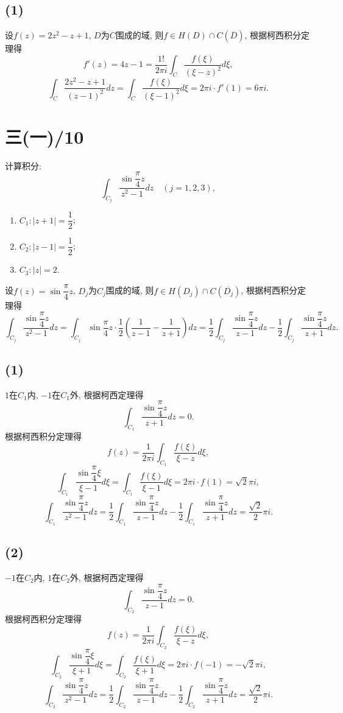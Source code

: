 \documentclass[11pt,a4paper]{article}
\begin{document}
\subsection*{(1)}
设$f(z)=2z^2-z+1$, $D$为$C$围成的域, 则$f\in H(D)\cap C(\overline{D})$, 根据柯西积分定理得
$$f'(z)=4z-1=\frac{1!}{2\pi i}\int_C\frac{f(\xi)}{(\xi-z)^2}d\xi,$$
$$\int_C\frac{2z^2-z+1}{(z-1)^2}dz=\int_C\frac{f(\xi)}{(\xi-1)^2}d\xi=2\pi i\cdot f'(1)=6\pi i.$$

\section{三(一)/10}
\begin{problem}
计算积分:
$$\int_{C_j}\frac{\sin\dfrac{\pi}{4}z}{z^2-1}dz\quad (j=1,2,3),$$
\begin{enumerate}
  \item $C_1:|z+1|=\dfrac{1}{2}$;
  \item $C_2:|z-1|=\dfrac{1}{2}$;
  \item $C_3:|z|=2$.
\end{enumerate}
\end{problem}

设$f(z)=\sin\dfrac{\pi}{4}z$, $D_j$为$C_j$围成的域, 则$f\in H(D_j)\cap C(\overline{D_j})$, 根据柯西积分定理得
$$\int_{C_j}\frac{\sin\dfrac{\pi}{4}z}{z^2-1}dz=\int_{C_j}\sin\dfrac{\pi}{4}z\cdot\frac{1}{2}\left(\frac{1}{z-1}-\frac{1}{z+1}\right)dz=\frac{1}{2}\int_{C_j}\frac{\sin\dfrac{\pi}{4}z}{z-1}dz-\frac{1}{2}\int_{C_j}\frac{\sin\dfrac{\pi}{4}z}{z+1}dz.$$

\subsection*{(1)}
$1$在$C_1$内, $-1$在$C_1$外, 根据柯西定理得
$$\int_{C_1}\frac{\sin\dfrac{\pi}{4}z}{z+1}dz=0.$$
根据柯西积分定理得
$$f(z)=\frac{1}{2\pi i}\int_{C_1}\frac{f(\xi)}{\xi-z}d\xi,$$
$$\int_{C_1}\frac{\sin\dfrac{\pi}{4}\xi}{\xi-1}d\xi=\int_{C_1}\frac{f(\xi)}{\xi-1}d\xi=2\pi i\cdot f(1)=\sqrt{2}\pi i,$$
$$\int_{C_1}\frac{\sin\dfrac{\pi}{4}z}{z^2-1}dz=\frac{1}{2}\int_{C_1}\frac{\sin\dfrac{\pi}{4}z}{z-1}dz-\frac{1}{2}\int_{C_1}\frac{\sin\dfrac{\pi}{4}z}{z+1}dz=\frac{\sqrt{2}}{2}\pi i.$$

\subsection*{(2)}
$-1$在$C_2$内, $1$在$C_2$外, 根据柯西定理得
$$\int_{C_2}\frac{\sin\dfrac{\pi}{4}z}{z-1}dz=0.$$
根据柯西积分定理得
$$f(z)=\frac{1}{2\pi i}\int_{C_2}\frac{f(\xi)}{\xi-z}d\xi,$$
$$\int_{C_2}\frac{\sin\dfrac{\pi}{4}\xi}{\xi+1}d\xi=\int_{C_2}\frac{f(\xi)}{\xi+1}d\xi=2\pi i\cdot f(-1)=-\sqrt{2}\pi i,$$
$$\int_{C_2}\frac{\sin\dfrac{\pi}{4}z}{z^2-1}dz=\frac{1}{2}\int_{C_2}\frac{\sin\dfrac{\pi}{4}z}{z-1}dz-\frac{1}{2}\int_{C_2}\frac{\sin\dfrac{\pi}{4}z}{z+1}dz=\frac{\sqrt{2}}{2}\pi i.$$
\end{document}
